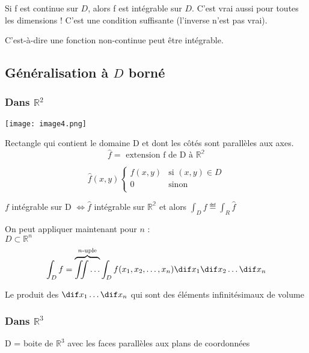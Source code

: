 \begin{mytheo}

Si f est continue sur $D$, alors f est intégrable sur $D$. C'est vrai aussi pour toutes les dimensions ! C'est une condition suffisante (l'inverse n'est pas vrai).

C'est-à-dire une fonction non-continue peut être intégrable.

\end{mytheo}

\subsection{ Généralisation à $D$ borné }

\subsubsection{ Dans $ \mathbb{R}^2$ }

\texttt{[image: image4.png]}

Rectangle qui contient le domaine D et dont les côtés sont parallèles aux axes.
\[\hat{f} = \text{ extension f de D à } \mathbb{R^2}\]

\[
\hat{f}(x,y)
\begin{cases}
f(x, y) & \text{si } (x, y) \in D \\
0 & \text{sinon} \\
\end{cases}%
\]

$f$ intégrable sur D $ \Longleftrightarrow \hat{f}$ intégrable sur $\mathbb{R^2}$ et alors
$\int_D f \eqdef \int_R \hat{f} $


On peut appliquer maintenant pour $n$ :
\\
$ D \subset \mathbb{R}^n$
$$\int_D f = \overbrace{\iint \dots}^\text{$n$-uple} \int_D f(x_1,x_2,\dots,x_n) \dif x_1 \dif x_2 \dots \dif x_n $$

Le produit des $\dif x_1 \dots \dif x_n $ qui sont des éléments infinitésimaux de volume

\subsubsection{Dans $\mathbb{R}^3$}

D = boite de $\mathbb{R}^3$ avec les faces parallèles aux plans de coordonnées\\

